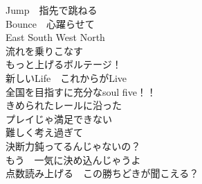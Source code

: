 {Jump　指先で跳ねる\\
Bounce　心躍らせて\\
East South West North\\
流れを乗りこなす\\
もっと上げるボルテージ！\\

新しいLife　これからがLive\\
全国を目指すに充分なsoul five！！\\
きめられたレールに沿った\\
プレイじゃ満足できない\\
難しく考え過ぎて\\
決断力鈍ってるんじゃないの？\\
もう　一気に決め込んじゃうよ\\
点数読み上げる　この勝ちどきが聞こえる？
}

